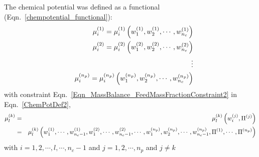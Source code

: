 The chemical potential was defined as a functional (Eqn.~\ref{chempotential_functional}):
\begin{eqnarray}
&& \mfr[\mu]{i}{1} = \mfr[\mu]{i}{1}\left(\mfr[w]{1}{1},\mfr[w]{2}{1},\cdots,\mfr[w]{n_{c}}{1}\right) \nonumber \\
&& \mfr[\mu]{i}{2} = \mfr[\mu]{i}{2}\left(\mfr[w]{1}{2},\mfr[w]{2}{2},\cdots,\mfr[w]{n_{c}}{2}\right) \nonumber \\
&& \hspace{2cm}\vdots \nonumber \\
&& \mfr[\mu]{i}{n_{p}} = \mfr[\mu]{i}{n_{p}}\left(\mfr[w]{1}{n_{p}},\mfr[w]{2}{n_{p}},\cdots,\mfr[w]{n_{c}}{n_{p}}\right) \label{ChemPotDef2}
\end{eqnarray}
with constraint Eqn.~\ref{Eqn_MassBalance_FeedMassFractionConstraint2} in Eqn.~\ref{ChemPotDef2},
\begin{eqnarray}
\mfr[\mu]{l}{k} &=& \mfr[\mu]{l}{k}\left(\mfr[w]{i}{j},\Pi^{(j)}\right) \nonumber \\
           &=& \mfr[\mu]{l}{k}\left(\mfr[w]{1}{1},\cdots,\mfr[w]{n_{c}-1}{1},\mfr[w]{1}{2},\cdots,\mfr[w]{n_{c}-1}{2},\cdots,\mfr[w]{1}{n_{p}},\mfr[w]{2}{n_{p}},\cdots,\mfr[w]{n_{c}-1}{n_{p}},\Pi^{(1)},\cdots,\mfr[\Pi]{}{n_{p}}\right)\nonumber
\end{eqnarray}
with $i=1,2,\cdots,l,\cdots,n_{c}-1$ and $j = 1,2,\cdots,n_{p}$ and $j\neq k$


